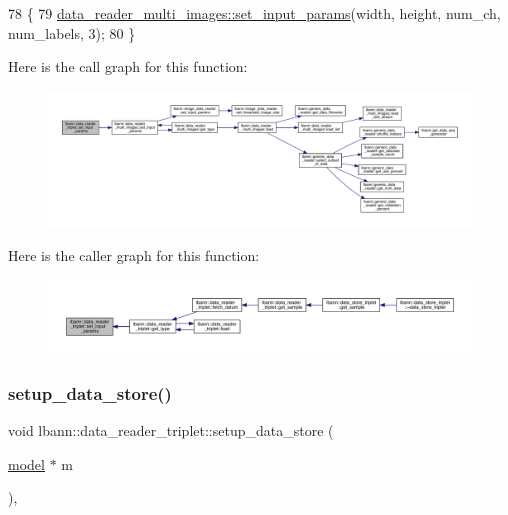 \begin{DoxyCode}
78                                                                                                            
               \{
79   \hyperlink{classlbann_1_1data__reader__multi__images_a57824ec9de5c1131b2f15a0cb3d4ab75}{data\_reader\_multi\_images::set\_input\_params}(width, height, 
      num\_ch, num\_labels, 3);
80 \}
\end{DoxyCode}
Here is the call graph for this function\+:\nopagebreak
\begin{figure}[H]
\begin{center}
\leavevmode
\includegraphics[width=350pt]{classlbann_1_1data__reader__triplet_a8172b4ac97d18b51814578a19a7f75c7_cgraph}
\end{center}
\end{figure}
Here is the caller graph for this function\+:\nopagebreak
\begin{figure}[H]
\begin{center}
\leavevmode
\includegraphics[width=350pt]{classlbann_1_1data__reader__triplet_a8172b4ac97d18b51814578a19a7f75c7_icgraph}
\end{center}
\end{figure}
\mbox{\label{classlbann_1_1data__reader__triplet_a2cd6fd46a7d2d90ccd754404683834c6}} 
\subsubsection{\texorpdfstring{setup\+\_\+data\+\_\+store()}{setup\_data\_store()}}
{\footnotesize\ttfamily void lbann\+::data\+\_\+reader\+\_\+triplet\+::setup\+\_\+data\+\_\+store (\begin{DoxyParamCaption}\item[{\hyperlink{classlbann_1_1model}{model} $\ast$}]{m }\end{DoxyParamCaption})\hspace{0.3cm}{\ttfamily [override]}, {\ttfamily [virtual]}}



